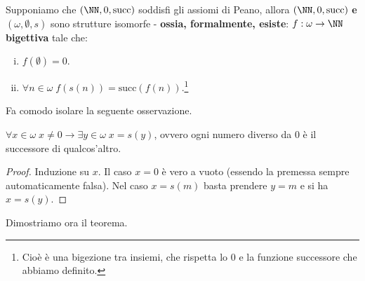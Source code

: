 \documentclass[11pt]{scrartcl}
\begin{document}
\begin{theorem}
	Supponiamo che $(\NN, 0, \text{succ})$ soddisfi gli assiomi di Peano, allora $(\NN, 0, \text{succ})$ \textbf{e} $(\omega,\emptyset,s)$ sono strutture isomorfe - \textbf{ossia, formalmente, esiste}:
	$ f : \omega \rightarrow \NN$ \textbf{bigettiva} tale che:
	\begin{enumerate}[(i)]
		\item $f(\emptyset) = 0$.
		\item $\forall n \in \omega \; f(s(n)) = \text{succ}(f(n))$.\footnote{Cioè è una bigezione tra insiemi, che rispetta lo 0 e la funzione successore che abbiamo definito.}
	\end{enumerate}
\end{theorem}

Fa comodo isolare la seguente osservazione.

\begin{remark}
	$\forall x \in \omega \; x \ne 0 \rightarrow \exists y \in \omega \; x = s(y)$, ovvero ogni numero diverso da 0 è il successore di qualcos'altro.
\end{remark}

\begin{proof}
	Induzione su $x$. Il caso $x = 0$ è vero a vuoto (essendo la premessa sempre automaticamente falsa). Nel caso $x = s(m)$ basta prendere $y = m$ e si ha $x = s(y)$.
\end{proof}

Dimostriamo ora il teorema.
\end{document}
